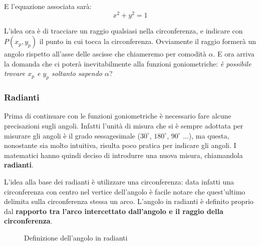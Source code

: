 E l'equazione associata sarà:
\begin{equation*}
    x^2+y^2=1
\end{equation*}

L'idea ora è di tracciare un raggio qualsiasi nella circonferenza, e indicare con $P(x_p, y_p)$ il punto in cui tocca la circonferenza. Ovviamente il raggio formerà un angolo rispetto all'asse delle ascisse che chiameremo per comodità $\alpha$. E ora arriva la domanda che ci poterà inevitabilmente alla funzioni goniometriche: \textit{è possibile trovare $x_p$ e $y_p$ soltanto sapendo $\alpha$}? 

\subsubsection{Radianti}
Prima di continuare con le funzioni goniometriche è necessario fare alcune precisazioni sugli angoli. Infatti l'unità di misura che si è sempre adottata per misurare gli angoli è il grado sessagesimale ($30^\circ$, $180^\circ$, $90^\circ$ ...), ma questa, nonostante sia molto intuitiva, risulta poco pratica per indicare gli angoli. I matematici hanno quindi deciso di introdurre una nuova misura, chiamandola \textbf{radianti}.

L'idea alla base dei radianti è utilizzare una circonferenza: data infatti una circonferenza con centro nel vertice dell'angolo è facile notare che quest'ultimo delimita sulla circonferenza stessa un arco. L'angolo in radianti è definito proprio dal \textbf{rapporto tra l'arco intercettato dall'angolo e il raggio della circonferenza}.



\begin{figure}
	\begin{center}

	\def\myrad{2cm}
	\def\myang{60}


	\end{center}
	\caption{Definizione dell'angolo in radianti}
\end{figure}



